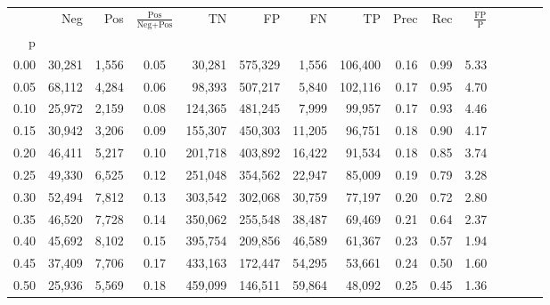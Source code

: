 \begin{tabular}{rrrcrrrrrrrrrrr}
\toprule
{} &     Neg &    Pos & $\frac{\text{Pos}}{\text{Neg}+\text{Pos}}$ &       TN &       FP &       FN &       TP &  Prec &   Rec & $\frac{\text{FP}}{\text{P}}$ \\
p    &         &        &                                            &          &          &          &          &       &       &                              \\
\midrule
0.00 &  30,281 &  1,556 &                                       0.05 &   30,281 &  575,329 &    1,556 &  106,400 &  0.16 &  0.99 &                         5.33 \\
0.05 &  68,112 &  4,284 &                                       0.06 &   98,393 &  507,217 &    5,840 &  102,116 &  0.17 &  0.95 &                         4.70 \\
0.10 &  25,972 &  2,159 &                                       0.08 &  124,365 &  481,245 &    7,999 &   99,957 &  0.17 &  0.93 &                         4.46 \\
0.15 &  30,942 &  3,206 &                                       0.09 &  155,307 &  450,303 &   11,205 &   96,751 &  0.18 &  0.90 &                         4.17 \\
0.20 &  46,411 &  5,217 &                                       0.10 &  201,718 &  403,892 &   16,422 &   91,534 &  0.18 &  0.85 &                         3.74 \\
0.25 &  49,330 &  6,525 &                                       0.12 &  251,048 &  354,562 &   22,947 &   85,009 &  0.19 &  0.79 &                         3.28 \\
0.30 &  52,494 &  7,812 &                                       0.13 &  303,542 &  302,068 &   30,759 &   77,197 &  0.20 &  0.72 &                         2.80 \\
0.35 &  46,520 &  7,728 &                                       0.14 &  350,062 &  255,548 &   38,487 &   69,469 &  0.21 &  0.64 &                         2.37 \\
0.40 &  45,692 &  8,102 &                                       0.15 &  395,754 &  209,856 &   46,589 &   61,367 &  0.23 &  0.57 &                         1.94 \\
0.45 &  37,409 &  7,706 &                                       0.17 &  433,163 &  172,447 &   54,295 &   53,661 &  0.24 &  0.50 &                         1.60 \\
0.50 &  25,936 &  5,569 &                                       0.18 &  459,099 &  146,511 &   59,864 &   48,092 &  0.25 &  0.45 &                         1.36 \\

\end{tabular}
